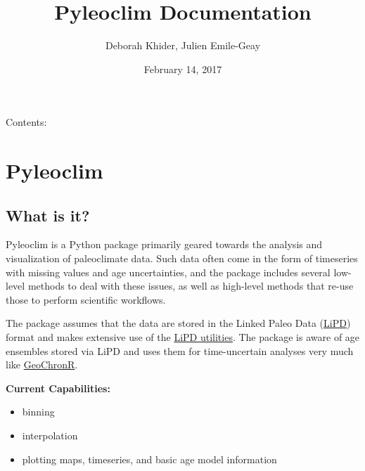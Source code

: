 \documentclass[letterpaper,10pt,english]{sphinxmanual}
\title{Pyleoclim Documentation}
\date{February 14, 2017}
\author{Deborah Khider, Julien Emile-Geay}
\begin{document}
\maketitle
\tableofcontents
{}\label{index::doc}


Contents:


\chapter{Pyleoclim}
\label{Introduction::doc}\label{Introduction:welcome-to-pyleoclim-s-documentation}\label{Introduction:pyleoclim}

\section{What is it?}
\label{Introduction:what-is-it}
Pyleoclim is a Python package primarily geared towards the analysis and visualization of paleoclimate data.
Such data often come in the form of timeseries with missing values and age uncertainties, and the package
includes several low-level methods to deal with these issues, as well as high-level methods that re-use those
to perform scientific workflows.

The package assumes that the data are stored in the Linked Paleo Data (\href{http://www.clim-past.net/12/1093/2016/}{LiPD})
format and makes extensive use of the \href{http://nickmckay.github.io/LiPD-utilities/}{LiPD utilities}. The package
is aware of age ensembles stored via LiPD and uses them for time-uncertain analyses very much like \href{http://nickmckay.github.io/GeoChronR/}{GeoChronR}.

\textbf{Current Capabilities:}
\begin{itemize}
\item {} 
binning

\item {} 
interpolation

\item {} 
plotting maps, timeseries, and basic age model information

\end{itemize}
\end{document}

